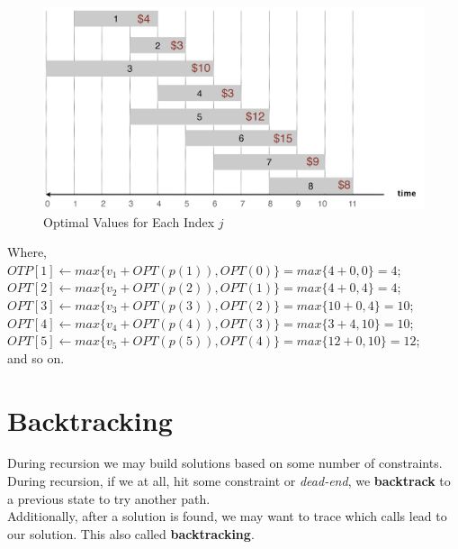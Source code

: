 \vspace{-1em}
\begin{figure}[h!]
    \centering
    \includegraphics[width=.9\textwidth]{Sections/dp/b_wis.png}
    \caption{Optimal Values for Each Index $j$}
    \label{fig:wis}
\end{figure}

\vspace{-1em}
\noindent
Where,\\
$OTP[1]\gets max\{v_1+OPT(p(1)), OPT(0)\} = max\{4+0, 0\} = 4$;\\
$OPT[2]\gets max\{v_2+OPT(p(2)), OPT(1)\} = max\{4+0, 4\} = 4$;\\
$OPT[3]\gets max\{v_3+OPT(p(3)), OPT(2)\} = max\{10+0, 4\} = 10$;\\
$OPT[4]\gets max\{v_4+OPT(p(4)), OPT(3)\} = max\{3+4, 10\} = 10$;\\
$OPT[5]\gets max\{v_5+OPT(p(5)), OPT(4)\} = max\{12+0, 10\} = 12$;\\
and so on.

\newpage

\section{Backtracking}
\noindent

\begin{Def}[Backtracking]

    During recursion we may build solutions based on some number of constraints. During recursion, if 
    we at all, hit some constraint or \textit{dead-end}, we \textbf{backtrack} to a previous state to try another path.\\

    \noindent
    Additionally, after a solution is found, we may want to trace which calls lead to our solution. This also called \textbf{backtracking}.
\end{Def}

